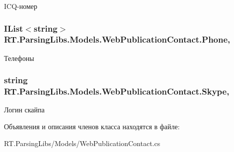 I\+C\+Q-\/номер 

\hypertarget{class_r_t_1_1_parsing_libs_1_1_models_1_1_web_publication_contact_a677eda8201ac2dc737655b5c1aa6e33e}{
\subsubsection[{Phone}]{\setlength{\rightskip}{0pt plus 5cm}I\+List$<$string$>$ R\+T.\+Parsing\+Libs.\+Models.\+Web\+Publication\+Contact.\+Phone\hspace{0.3cm}{\ttfamily [get]}, {\ttfamily [set]}}}\label{class_r_t_1_1_parsing_libs_1_1_models_1_1_web_publication_contact_a677eda8201ac2dc737655b5c1aa6e33e}


Телефоны 

\hypertarget{class_r_t_1_1_parsing_libs_1_1_models_1_1_web_publication_contact_a3fb17a3e509f5249912913c5912e41c4}{
\subsubsection[{Skype}]{\setlength{\rightskip}{0pt plus 5cm}string R\+T.\+Parsing\+Libs.\+Models.\+Web\+Publication\+Contact.\+Skype\hspace{0.3cm}{\ttfamily [get]}, {\ttfamily [set]}}}\label{class_r_t_1_1_parsing_libs_1_1_models_1_1_web_publication_contact_a3fb17a3e509f5249912913c5912e41c4}


Логин скайпа 



Объявления и описания членов класса находятся в файле\+:\begin{DoxyCompactItemize}
\item 
R\+T.\+Parsing\+Libs/\+Models/Web\+Publication\+Contact.\+cs\end{DoxyCompactItemize}

